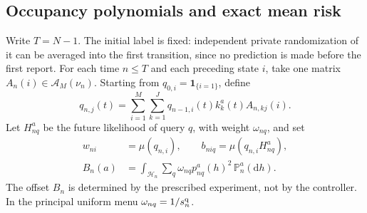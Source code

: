 \subsection{Occupancy polynomials and exact mean risk}
Write $T=N-1$. The initial label is fixed: independent private
randomization of it can be averaged into the first transition, since
no prediction is made before the first report. For each time $n\le T$ and each preceding state $i$, take
one matrix $A_n(i)\in\mathscr A_M(\nu_n)$. Starting from
$q_{0,i}=\mathbf1_{\{i=1\}}$, define
\begin{equation}\label{eq:v33-q-recursion}
 q_{n,j}(t)=\sum_{i=1}^M\sum_{k=1}^J
        q_{n-1,i}(t)k_k^a(t)A_{n,kj}(i).
\end{equation}
Let $H^a_{nq}$ be the future likelihood of query $q$, with weight
$\omega_{nq}$, and set
\begin{equation}\label{eq:v33-coefficients}
 \begin{split}
 w_{ni}&=\mu(q_{n,i}),\qquad
 b_{niq}=\mu(q_{n,i}H^a_{nq}),\\
 B_n(a)&=\int_{\mathcal H_n}\sum_q\omega_{nq}
                    p^a_{nq}(h)^2\,\mathbb P_n^a(\mathrm dh).
 \end{split}
\end{equation}
The offset $B_n$ is determined by the prescribed experiment, not by
the controller. In the principal uniform menu
$\omega_{nq}=1/s_n^{\rm q}$.

